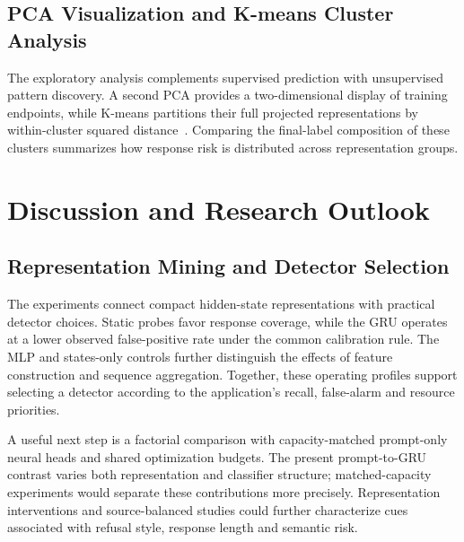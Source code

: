 \subsection{PCA Visualization and K-means Cluster Analysis}
The exploratory analysis complements supervised prediction with unsupervised pattern discovery. A second PCA provides a two-dimensional display of training endpoints, while K-means partitions their full projected representations by within-cluster squared distance~\cite{lloyd1982quantization}. Comparing the final-label composition of these clusters summarizes how response risk is distributed across representation groups.


\section{Discussion and Research Outlook}
\subsection{Representation Mining and Detector Selection}
The experiments connect compact hidden-state representations with practical detector choices. Static probes favor response coverage, while the GRU operates at a lower observed false-positive rate under the common calibration rule. The MLP and states-only controls further distinguish the effects of feature construction and sequence aggregation. Together, these operating profiles support selecting a detector according to the application's recall, false-alarm and resource priorities.

A useful next step is a factorial comparison with capacity-matched prompt-only neural heads and shared optimization budgets. The present prompt-to-GRU contrast varies both representation and classifier structure; matched-capacity experiments would separate these contributions more precisely. Representation interventions and source-balanced studies could further characterize cues associated with refusal style, response length and semantic risk.

